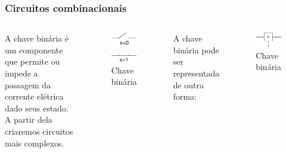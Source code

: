 \begin{frame}
	\frametitle{Circuitos combinacionais}
	\begin{columns}
		\par A chave binária é um componente que permite ou impede a passagem da corrente elétrica dado seus estado. A partir dela criaremos circuitos mais complexos.
		\begin{figure}
			\centering
			\includegraphics[width=0.2\linewidth]{images/chaveBinaria}
			\caption{Chave binária}
			\label{fig:chavebinaria}
		\end{figure}
		\par A chave binária pode ser representada de outra forma:
		\begin{figure}
			\centering
			\includegraphics[width=0.7\linewidth]{images/chaveBinariaAbstrata}
			\caption{Chave binária}
			\label{fig:chavebinariaabstrata}
		\end{figure}
	\end{columns}
\end{frame}

